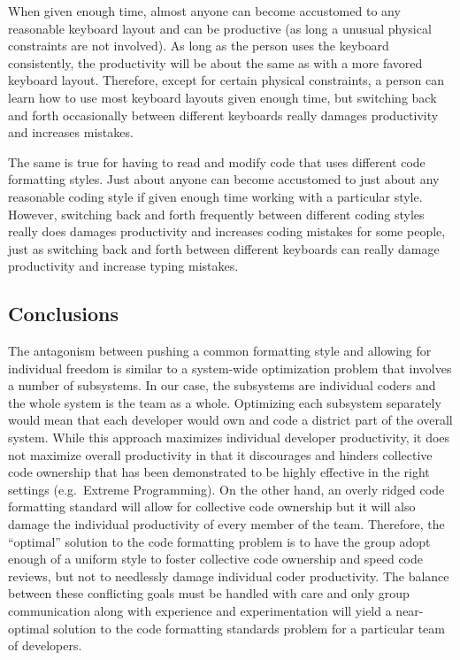 When given enough time, almost anyone can become accustomed to any reasonable
keyboard layout and can be productive (as long a unusual physical constraints
are not involved).  As long as the person uses the keyboard consistently, the
productivity will be about the same as with a more favored keyboard layout.
Therefore, except for certain physical constraints, a person can learn how to
use most keyboard layouts given enough time, but switching back and forth
occasionally between different keyboards really damages productivity and
increases mistakes.

The same is true for having to read and modify code that uses different code
formatting styles.  Just about anyone can become accustomed to just about any
reasonable coding style if given enough time working with a particular style.
However, switching back and forth frequently between different coding styles
really does damages productivity and increases coding mistakes for some
people, just as switching back and forth between different keyboards can
really damage productivity and increase typing mistakes.


%
\subsection{Conclusions}
%

The antagonism between pushing a common formatting style and allowing for
individual freedom is similar to a system-wide optimization problem that
involves a number of subsystems.  In our case, the subsystems are individual
coders and the whole system is the team as a whole.  Optimizing each subsystem
separately would mean that each developer would own and code a district part
of the overall system.  While this approach maximizes individual developer
productivity, it does not maximize overall productivity in that it discourages
and hinders collective code ownership that has been demonstrated to be highly
effective in the right settings (e.g.\ Extreme Programming).  On the other
hand, an overly ridged code formatting standard will allow for collective code
ownership but it will also damage the individual productivity of every member
of the team.  Therefore, the ``optimal'' solution to the code formatting
problem is to have the group adopt enough of a uniform style to foster
collective code ownership and speed code reviews, but not to needlessly damage
individual coder productivity.  The balance between these conflicting goals
must be handled with care and only group communication along with experience
and experimentation will yield a near-optimal solution to the code formatting
standards problem for a particular team of developers.

